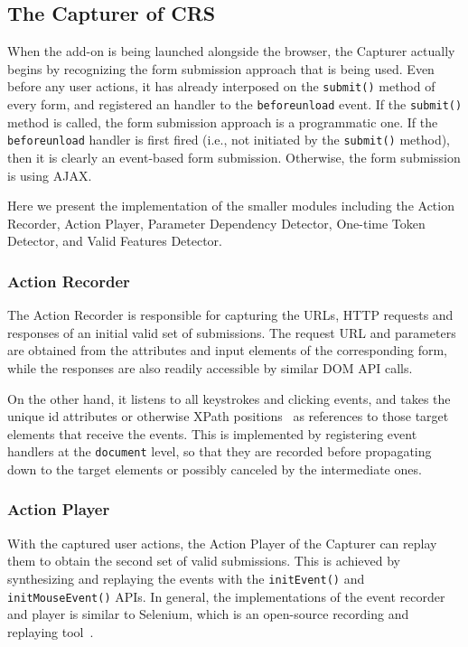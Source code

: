 \documentclass[letter]{sig-alternate-2013}
\begin{document}
\subsection{The Capturer of CRS}
When the add-on is being launched alongside the browser, the Capturer actually begins by recognizing the form submission approach that is being used. Even before any user actions, it has already interposed on the \verb"submit()" method of every form, and registered an handler to the \verb"beforeunload" event. If the \verb"submit()" method is called, the form submission approach is a programmatic one. If the \verb"beforeunload" handler is first fired (i.e., not initiated by the \verb"submit()" method), then it is clearly an event-based form submission. Otherwise, the form submission is using AJAX.

Here we present the implementation of the smaller modules including the Action Recorder, Action Player, Parameter Dependency Detector, One-time Token Detector, and Valid Features Detector.

\subsubsection{Action Recorder}
The Action Recorder is responsible for capturing the URLs, HTTP requests and responses of an initial valid set of submissions. The request URL and parameters are obtained from the attributes and input elements of the corresponding form, while the responses are also readily accessible by similar DOM API calls.

On the other hand, it listens to all keystrokes and clicking events, and takes the unique id attributes or otherwise XPath positions~\cite{xpath} as references to those target elements that receive the events. This is implemented by registering event handlers at the \verb"document" level, so that they are recorded before propagating down to the target elements or possibly canceled by the intermediate ones. 

\subsubsection{Action Player}

With the captured user actions, the Action Player of the Capturer can replay them to obtain the second set of valid submissions. This is achieved by synthesizing and replaying the events with the \verb"initEvent()" and \verb"initMouseEvent()" APIs. In general, the implementations of the event recorder and player is similar to Selenium, which is an open-source recording and replaying tool~\cite{selenium}.
\end{document}
